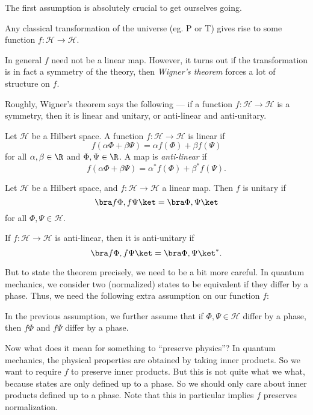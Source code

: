 \documentclass[a4paper]{article}
\begin{document}
The first assumption is absolutely crucial to get ourselves going.
\begin{assumption}
  Any classical transformation of the universe (eg. P or T) gives rise to some function $f: \mathcal{H} \to \mathcal{H}$.
\end{assumption}
In general $f$ need not be a linear map. However, it turns out if the transformation is in fact a symmetry of the theory, then \emph{Wigner's theorem} forces a lot of structure on $f$.

Roughly, Wigner's theorem says the following --- if a function $f: \mathcal{H} \to \mathcal{H}$ is a symmetry, then it is linear and unitary, or anti-linear and anti-unitary.
\begin{defi}
  Let $\mathcal{H}$ be a Hilbert space. A function $f: \mathcal{H} \to \mathcal{H}$ is linear if
  \[
    f(\alpha \Phi + \beta \Psi) = \alpha f(\Phi) + \beta f(\Psi)
  \]
  for all $\alpha, \beta \in \R$ and $\Phi, \Psi \in \R$. A map is \emph{anti-linear} if
  \[
    f(\alpha \Phi + \beta \Psi) = \alpha^* f(\Phi) + \beta^* f(\Psi).
  \]
\end{defi}
\begin{defi}
  Let $\mathcal{H}$ be a Hilbert space, and $f: \mathcal{H} \to \mathcal{H}$ a linear map. Then $f$ is unitary if
  \[
    \bra f \Phi, f \Psi\ket = \bra \Phi, \Psi\ket
  \]
  for all $\Phi, \Psi \in \mathcal{H}$.

  If $f: \mathcal{H} \to \mathcal{H}$ is anti-linear, then it is anti-unitary if
  \[
    \bra f \Phi, f \Psi\ket = \bra \Phi, \Psi\ket^*.
  \]
\end{defi}
But to state the theorem precisely, we need to be a bit more careful. In quantum mechanics, we consider two (normalized) states to be equivalent if they differ by a phase. Thus, we need the following extra assumption on our function $f$:
\begin{assumption}
  In the previous assumption, we further assume that if $\Phi, \Psi \in \mathcal{H}$ differ by a phase, then $f\Phi$ and $f\Psi$ differ by a phase.
\end{assumption}
Now what does it mean for something to ``preserve physics''? In quantum mechanics, the physical properties are obtained by taking inner products. So we want to require $f$ to preserve inner products. But this is not quite what we what, because states are only defined up to a phase. So we should only care about inner products defined up to a phase. Note that this in particular implies $f$ preserves normalization.
\end{document}
